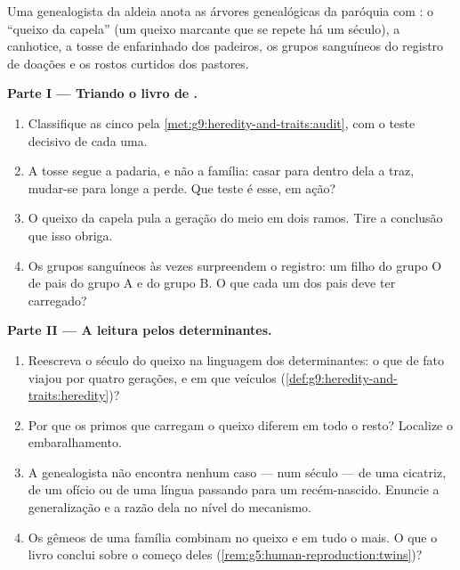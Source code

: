 \begin{problem}\label{pb:g9:heredity-and-traits:1}
Uma genealogista da aldeia anota as árvores genealógicas da
paróquia com : o ``queixo da capela'' (um
queixo marcante que se repete há um século), a canhotice, a
tosse de  enfarinhado dos padeiros, os grupos
sanguíneos do registro de doações e os rostos curtidos dos
pastores.

\medskip\noindent\textbf{Parte I --- Triando o livro de
.}
\begin{enumerate}
  \item Classifique as cinco  pela
        \cref{met:g9:heredity-and-traits:audit}, com o teste
        decisivo de cada uma.
  \item A tosse segue a padaria, e não a família: casar para
        dentro dela a traz, mudar-se para longe a perde. Que
        teste é esse, em ação?
  \item O queixo da capela pula a geração do meio em dois
        ramos. Tire a conclusão que isso obriga.
  \item Os grupos sanguíneos às vezes surpreendem o
        registro: um filho do grupo O de pais do grupo A e
        do grupo B. O que cada um dos pais deve ter
        carregado?
\end{enumerate}

\medskip\noindent\textbf{Parte II --- A leitura pelos
determinantes.}
\begin{enumerate}[resume]
  \item Reescreva o século do queixo na linguagem dos
        determinantes: o que de fato viajou por quatro
        gerações, e em que veículos
        (\cref{def:g9:heredity-and-traits:heredity})?
  \item Por que os primos que carregam o queixo diferem em
        todo o resto? Localize o embaralhamento.
  \item A genealogista não encontra nenhum caso --- num
        século --- de uma cicatriz, de um ofício ou de uma
        língua passando para um recém-nascido. Enuncie a
        generalização e a razão dela no nível do mecanismo.
  \item Os gêmeos de uma família combinam no queixo e em
        tudo o mais. O que o livro conclui sobre o começo
        deles (\cref{rem:g5:human-reproduction:twins})?
\end{enumerate}


\end{problem}

